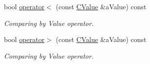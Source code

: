 \begin{DoxyCompactItemize}
bool \hyperlink{class_c_value___t_week_day_1_1_c_value_a8cbf6de4d8c42c14ce05ed46aa6ecb20}{operator$<$} (const \hyperlink{class_c_value___t_week_day_1_1_c_value}{C\+Value} \&a\+Value) const
\begin{DoxyCompactList}\small\item\em Comparing by Value operator. \end{DoxyCompactList}\item 
bool \hyperlink{class_c_value___t_week_day_1_1_c_value_ae5deb329e36bc2f814b39ca397199211}{operator$>$} (const \hyperlink{class_c_value___t_week_day_1_1_c_value}{C\+Value} \&a\+Value) const
\begin{DoxyCompactList}\small\item\em Comparing by Value operator. \end{DoxyCompactList}\end{DoxyCompactItemize}
